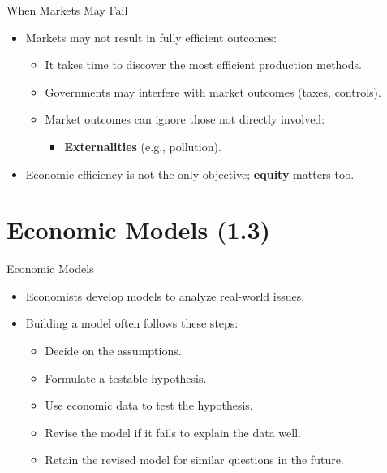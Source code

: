 \documentclass[aspectratio=169]{beamer}
\begin{document}
\begin{frame}{When Markets May Fail}
\transfade
\begin{itemize}[<+->]
  \item Markets may not result in fully efficient outcomes:
  \begin{itemize}[<+->]
    \item It takes time to discover the most efficient production methods.
    \item Governments may interfere with market outcomes (taxes, controls).
    \item Market outcomes can ignore those not directly involved:
    \begin{itemize}[<+->]
      \item \textbf{Externalities} (e.g., pollution).
    \end{itemize}
  \end{itemize}
  \item Economic efficiency is not the only objective; \textbf{equity} matters too.
\end{itemize}
\end{frame}

\section{Economic Models (1.3)}

\begin{frame}{Economic Models}
\transfade
\begin{itemize}[<+->]
  \item Economists develop models to analyze real-world issues.
  \item Building a model often follows these steps:
  \begin{itemize}[<+->]
    \item Decide on the assumptions.
    \item Formulate a testable hypothesis.
    \item Use economic data to test the hypothesis.
    \item Revise the model if it fails to explain the data well.
    \item Retain the revised model for similar questions in the future.
  \end{itemize}
\end{itemize}
\end{frame}
\end{document}
